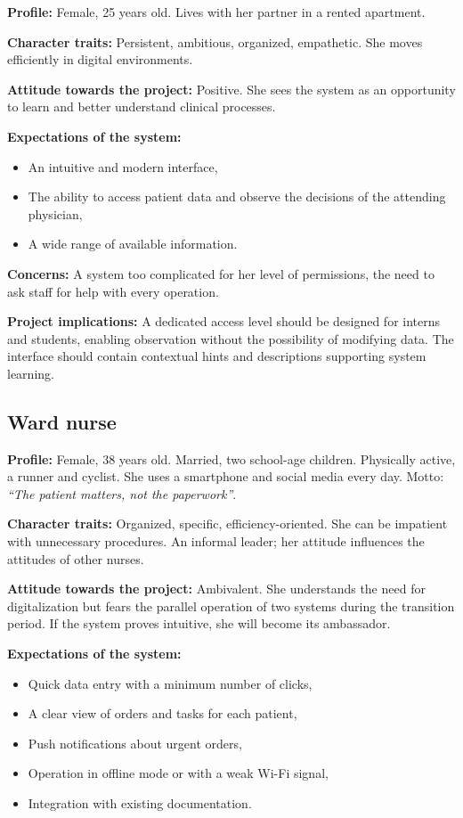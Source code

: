 \textbf{Profile:} Female, 25 years old. Lives with her partner in a rented apartment.

\textbf{Character traits:} Persistent, ambitious, organized, empathetic. She moves efficiently in digital environments.

\textbf{Attitude towards the project:} Positive. She sees the system as an opportunity to learn and better understand clinical processes.

\textbf{Expectations of the system:}
\begin{itemize}
    \item An intuitive and modern interface,
    \item The ability to access patient data and observe the decisions of the attending physician,
    \item A wide range of available information.
\end{itemize}

\textbf{Concerns:} A system too complicated for her level of permissions, the need to ask staff for help with every operation.

\textbf{Project implications:} A dedicated access level should be designed for interns and students, enabling observation without the possibility of modifying data. The interface should contain contextual hints and descriptions supporting system learning.

\subsection{Ward nurse}

\textbf{Profile:} Female, 38 years old. Married, two school-age children. Physically active, a runner and cyclist. She uses a smartphone and social media every day. Motto: \emph{``The patient matters, not the paperwork''}.

\textbf{Character traits:} Organized, specific, efficiency-oriented. She can be impatient with unnecessary procedures. An informal leader; her attitude influences the attitudes of other nurses.

\textbf{Attitude towards the project:} Ambivalent. She understands the need for digitalization but fears the parallel operation of two systems during the transition period. If the system proves intuitive, she will become its ambassador.

\textbf{Expectations of the system:}
\begin{itemize}
    \item Quick data entry with a minimum number of clicks,
    \item A clear view of orders and tasks for each patient,
    \item Push notifications about urgent orders,
    \item Operation in offline mode or with a weak Wi-Fi signal,
    \item Integration with existing documentation.
\end{itemize}

